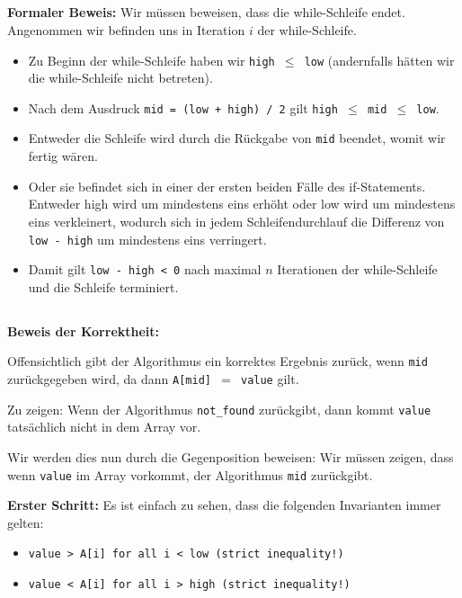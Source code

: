 \documentclass[10pt,a4paper,oneside,ngerman,numbers=noenddot]{scrartcl}
\begin{document}
	\subsection{} %
		\textbf{Formaler Beweis:} Wir müssen beweisen, dass die while-Schleife endet. Angenommen wir befinden uns in Iteration $i$ der while-Schleife.
		\begin{itemize}
			\item	Zu Beginn der while-Schleife haben wir \texttt{high $\leq$ low} (andernfalls hätten wir die while-Schleife nicht betreten).
			\item	Nach dem Ausdruck \texttt{mid = (low + high) / 2} gilt \texttt{high $\leq$ mid $\leq$ low}.
			\item	Entweder die Schleife wird durch die Rückgabe von \texttt{mid} beendet, womit wir fertig wären.
			\item	Oder sie befindet sich in einer der ersten beiden Fälle des if-Statements. Entweder high wird um mindestens eins erhöht oder low wird um mindestens eins verkleinert, wodurch sich in jedem Schleifendurchlauf die Differenz von \texttt{low - high} um mindestens eins verringert.
			\item	Damit gilt \texttt{low - high < 0} nach maximal $n$ Iterationen der while-Schleife und die Schleife terminiert.
		\end{itemize}
	\subsection{} %
		\textbf{Beweis der Korrektheit:}
		
		Offensichtlich gibt der Algorithmus ein korrektes Ergebnis zurück, wenn \texttt{mid} zurückgegeben wird, da dann \texttt{A[mid] $=$ value} gilt.
		
		Zu zeigen: Wenn der Algorithmus \texttt{not\_found} zurückgibt, dann kommt \texttt{value} tatsächlich nicht in dem Array vor.
		
		Wir werden dies nun durch die Gegenposition beweisen: Wir müssen zeigen, dass wenn \texttt{value} im Array vorkommt, der Algorithmus \texttt{mid} zurückgibt.
		
		\textbf{Erster Schritt:} Es ist einfach zu sehen, dass die folgenden Invarianten immer gelten:
		\begin{itemize}
			\item	\texttt{value > A[i] for all i < low (strict inequality!)}
			\item	\texttt{value < A[i] for all i > high (strict inequality!)}
		\end{itemize}
		
\end{document}
